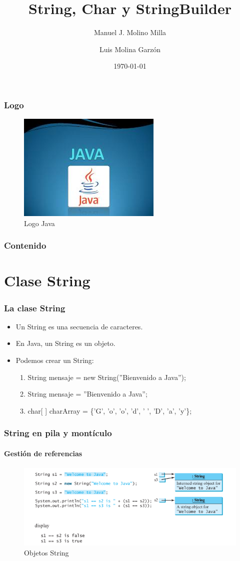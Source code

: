 \documentclass{beamer}
\title{String, Char y StringBuilder}
\author{Manuel J. Molino Milla \and Luis Molina Garzón}
\date{\today} %
\institute{IES Virgen del Carmen \and Departamento de Informática}
\begin{document}
\begin{frame}
  \titlepage
\end{frame}

\begin{frame}
    \frametitle{Logo}
\begin{figure}
\includegraphics[scale=1]{imagenes/logo.jpeg} 
\caption{Logo Java}
\end{figure}
\end{frame}

\begin{frame}
  \frametitle{Contenido}
  \tableofcontents[pausesections]
\end{frame}



\section{Clase String}


\begin{frame}
\frametitle{La clase String}
\begin{itemize}[<+->]
\item Un String es una secuencia de caracteres.
\item En Java, un String es un objeto.
\item Podemos crear un String:
\begin{enumerate}
\item String mensaje = new String(''Bienvenido a Java'');
\item String mensaje = ''Bienvenido a Java'';
\item char[ ] charArray = \{'G', 'o', 'o', 'd', ' ', 'D', 'a', 'y'\};
\end{enumerate}
\end{itemize}
\end{frame}

\begin{frame}
\frametitle{String en pila y montículo}
\framesubtitle{Gestión de referencias}
\begin{figure}
\includegraphics[scale=0.6]{imagenes/referencia.png}
\caption{Objetos String}
\end{figure}
\end{frame}
\end{document}
